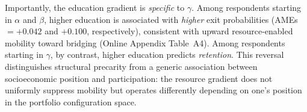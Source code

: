 Importantly, the education gradient is \emph{specific} to $\gamma$. Among respondents starting in $\alpha$ and $\beta$, higher education is associated with \emph{higher} exit probabilities (AMEs~$= +0.042$ and $+0.100$, respectively), consistent with upward resource-enabled mobility toward bridging (Online Appendix Table~A4). Among respondents starting in $\gamma$, by contrast, higher education predicts \emph{retention}. This reversal distinguishes structural precarity from a generic association between socioeconomic position and participation: the resource gradient does not uniformly suppress mobility but operates differently depending on one's position in the portfolio configuration space.

\begin{table}[htbp]
\centering
\caption{Portfolio-position persistence and socioeconomic gradient in exits from bridging}
\label{table:h3_main}
\small
\renewcommand{\arraystretch}{1.10}
\end{table}
